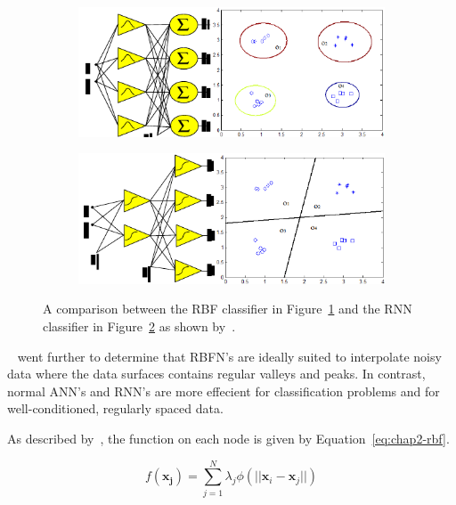 \begin{figure}
  \centering
  \begin{subfigure}{0.5\textwidth}
    \includegraphics[width=\textwidth]{figures/chapter2/rbf_class}
    \caption{}
    \label{fig:chap2-rbf-classifier}
  \end{subfigure}
  \begin{subfigure}{0.5\textwidth}
    \includegraphics[width=\textwidth]{figures/chapter2/rnn_class}
    \caption{}
    \label{fig:chap2-rnn-classifier}
  \end{subfigure}
  \caption[A comparison between the RBF and RNN classifiers. ]{A comparison between the RBF classifier in Figure~\ref{fig:chap2-rbf-classifier} and the RNN classifier in Figure~\ref{fig:chap2-rnn-classifier} as shown by~\cite{xie2011comparison}. }
\label{fig:chap2-classifier}
\end{figure}

~\citeauthor{xie2011comparison} went further to determine that RBFN's are ideally suited to interpolate noisy data where the data surfaces contains regular valleys and peaks. In contrast, normal ANN's and RNN's are more effecient for classification problems and for well-conditioned, regularly spaced data. 

As described by~\cite{skala2012radial}, the function on each node is given by Equation~\ref{eq:chap2-rbf}.

\begin{equation}
  \label{eq:chap2-rbf}
  f(\bm{x_j}) = \sum\limits_{j = 1}^{N}\lambda_j \phi(|| \bm{x}_i - \bm{x}_j ||)
\end{equation}

